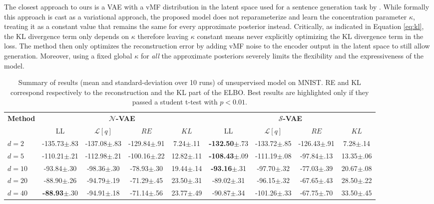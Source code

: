 \documentclass[letterpaper]{article}
\begin{document}
The closest approach to ours is a VAE with a vMF distribution in the latent space used for a sentence generation task by \citep{guu2017generating}. While formally this approach is cast as a variational approach, the proposed model does not reparameterize and learn the concentration parameter $\kappa$, treating it as a constant value that remains the same for every approximate posterior instead. Critically, as indicated in Equation \ref{eq:kl}, the KL divergence term only depends on $\kappa$ therefore leaving $\kappa$ constant means never explicitly optimizing the KL divergence term in the loss. The method then only optimizes the reconstruction error by adding vMF noise to the encoder output in the latent space to still allow generation. Moreover, using a fixed global $\kappa$ for \textit{all} the approximate posteriors severely limits the flexibility and the expressiveness of the model.
 
 \begin{table*}[t]
  \centering
  \caption{Summary of results (mean and standard-deviation over 10 runs) of unsupervised model on MNIST. RE and KL correspond respectively to the reconstruction and the KL part of the ELBO. Best results are highlighted only if they passed a student t-test with $p<0.01$.}
  \bigskip
  \begin{tabular}{l|cccc|cccc}
    \toprule
    \multirow{2}{*}{\textbf{Method}} &
        \multicolumn{4}{c}{\textbf{$\mathcal{N}$-VAE}} &
        \multicolumn{4}{c}{\textbf{$\mathcal{S}$-VAE}}
        \\
        & LL & $\mathcal{L}[q]$ & $RE$ & $KL$ & LL & $\mathcal{L}[q]$ & $RE$ & $KL$ \\
    \midrule
$d=2$&-135.73{\tiny$\pm$.83}&-137.08{\tiny$\pm$.83}&-129.84{\tiny$\pm$.91}&7.24{\tiny$\pm$.11}&\textbf{-132.50}{\tiny$\pm$.73}&-133.72{\tiny$\pm$.85}&-126.43{\tiny$\pm$.91}&7.28{\tiny$\pm$.14}\\
$d=5$&-110.21{\tiny$\pm$.21}&-112.98{\tiny$\pm$.21}&-100.16{\tiny$\pm$.22}&12.82{\tiny$\pm$.11}&\textbf{-108.43}{\tiny$\pm$.09}&-111.19{\tiny$\pm$.08}&-97.84{\tiny$\pm$.13}&13.35{\tiny$\pm$.06}\\
$d=10$&-93.84{\tiny$\pm$.30}&-98.36{\tiny$\pm$.30}&-78.93{\tiny$\pm$.30}&19.44{\tiny$\pm$.14}&\textbf{-93.16}{\tiny$\pm$.31}&-97.70{\tiny$\pm$.32}&-77.03{\tiny$\pm$.39}&20.67{\tiny$\pm$.08}\\
$d=20$&-88.90{\tiny$\pm$.26}&-94.79{\tiny$\pm$.19}&-71.29{\tiny$\pm$.45}&23.50{\tiny$\pm$.31}&-89.02{\tiny$\pm$.31}&-96.15{\tiny$\pm$.32}&-67.65{\tiny$\pm$.43}&28.50{\tiny$\pm$.22}\\
$d=40$&\textbf{-88.93}{\tiny$\pm$.30}&-94.91{\tiny$\pm$.18}&-71.14{\tiny$\pm$.56}&23.77{\tiny$\pm$.49}&-90.87{\tiny$\pm$.34}&-101.26{\tiny$\pm$.33}&-67.75{\tiny$\pm$.70}&33.50{\tiny$\pm$.45}\\
    \bottomrule
  \end{tabular}
  \label{tab:mnist}
\end{table*}
 
\end{document}
